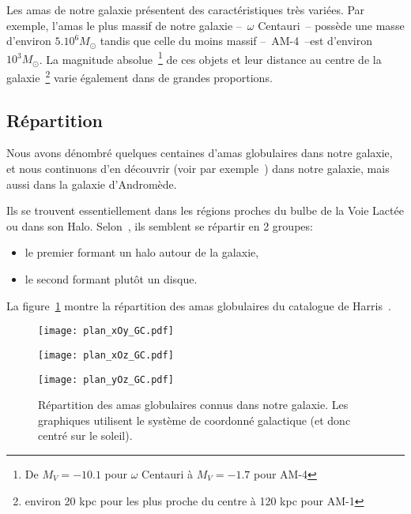 			Les amas de notre galaxie présentent des caractéristiques très variées. Par
			exemple, l'amas le plus massif de notre galaxie --~$\omega$ Centauri~--
			possède une masse d'environ $5.10^6 M_\odot$ tandis que celle du moins
			massif --~AM-4~--est d'environ $10^3 M_\odot$. La magnitude
			absolue~\footnote{De $M_V = -10.1$ pour $\omega$ Centauri à $M_V = -1.7$
			pour AM-4} de ces objets et leur distance au centre de la
			galaxie~\footnote{environ 20 kpc pour les plus proche du centre à 120 kpc
			pour AM-1} varie également dans de grandes proportions.

		\subsection{Répartition}

			Nous avons dénombré quelques centaines d'amas globulaires dans
			notre galaxie, et nous continuons d'en découvrir (voir par
			exemple~\cite{2014ApJ...786L...3L}) dans notre galaxie, mais aussi dans la galaxie d'Andromède.

			Ils se trouvent essentiellement dans les régions proches du
			bulbe de la Voie Lactée ou dans son Halo. Selon~\cite{MH-AAR1997}, ils semblent
			se répartir en 2 groupes:
			\begin{itemize}
				\item le premier formant un halo autour de la galaxie,
				\item le second formant plutôt un disque.
			\end{itemize}

			La figure~\ref{Fig::Intro::repartition} montre la répartition des amas globulaires du catalogue de Harris~\cite{Harris}.
			\begin{figure}
				\begin{minipage}{0.45\textwidth}
					\begin{center}
						\texttt{[image: plan\_xOy\_GC.pdf]}
					\end{center}
				\end{minipage}\hfill
				\begin{minipage}{0.45\textwidth}
					\begin{center}
						\texttt{[image: plan\_xOz\_GC.pdf]}
					\end{center}
				\end{minipage}
				\begin{center}
					\begin{minipage}{0.45\textwidth}
						\texttt{[image: plan\_yOz\_GC.pdf]}
					\end{minipage}
				\end{center}
				\caption{\label{Fig::Intro::repartition}Répartition des amas globulaires connus dans notre galaxie. Les graphiques utilisent le système de coordonné galactique (et donc centré sur le soleil).}
			\end{figure}


